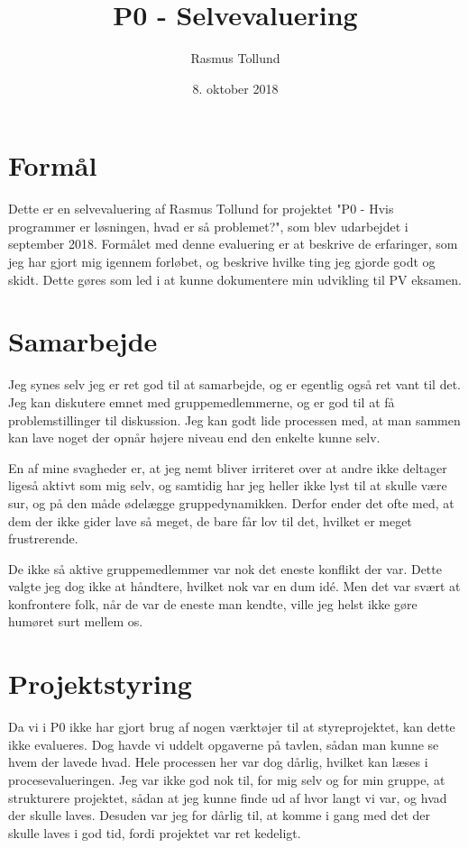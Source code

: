 \documentclass[10pt,a4paper]{article}
\author{Rasmus Tollund}
\title{P0 - Selvevaluering}
\date{8. oktober 2018}
\begin{document}
\maketitle

\section*{Formål}
Dette er en selvevaluering af Rasmus Tollund for projektet "P0 - Hvis programmer er løsningen, hvad er så problemet?", som blev udarbejdet i september 2018. Formålet med denne evaluering er at beskrive de erfaringer, som jeg har gjort mig igennem forløbet, og beskrive hvilke ting jeg gjorde godt og skidt. Dette gøres som led i at kunne dokumentere min udvikling til PV eksamen.

\section*{Samarbejde}
Jeg synes selv jeg er ret god til at samarbejde, og er egentlig også ret vant til det. Jeg kan diskutere emnet med gruppemedlemmerne, og er god til at få problemstillinger til diskussion. Jeg kan godt lide processen med, at man sammen kan lave noget der opnår højere niveau end den enkelte kunne selv.

En af mine svagheder er, at jeg nemt bliver irriteret over at andre ikke deltager ligeså aktivt som mig selv, og samtidig har jeg heller ikke lyst til at skulle være sur, og på den måde ødelægge gruppedynamikken. Derfor ender det ofte med, at dem der ikke gider lave så meget, de bare får lov til det, hvilket er meget frustrerende.

De ikke så aktive gruppemedlemmer var nok det eneste konflikt der var. Dette valgte jeg dog ikke at håndtere, hvilket nok var en dum idé. Men det var svært at konfrontere folk, når de var de eneste man kendte, ville jeg helst ikke gøre humøret surt mellem os.

\section*{Projektstyring}
Da vi i P0 ikke har gjort brug af nogen værktøjer til at styreprojektet, kan dette ikke evalueres. Dog havde vi uddelt opgaverne på tavlen, sådan man kunne se hvem der lavede hvad. Hele processen her var dog dårlig, hvilket kan læses i procesevalueringen. Jeg var ikke god nok til, for mig selv og for min gruppe, at strukturere projektet, sådan at jeg kunne finde ud af hvor langt vi var, og hvad der skulle laves. Desuden var jeg for dårlig til, at komme i gang med det der skulle laves i god tid, fordi projektet var ret kedeligt.
\end{document}
